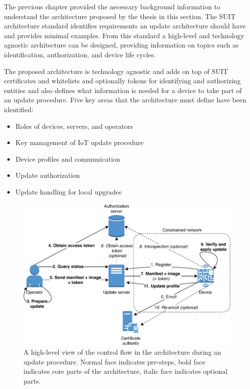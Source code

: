 \documentclass[0-thesis.tex]{subfiles}
\begin{document}
The previous chapter provided the necessary background information to understand the
architecture proposed by the thesis in this section. The SUIT architecture standard
identifies requirements an update architecture should have and provides minimal examples.
From this standard a high-level and technology agnostic architecture can be designed,
providing information on topics such as identification, authorization, and device life
cycles. 

The proposed architecture is technology agnostic and adds on top of SUIT certificates and
whitelists and optionally tokens for identifying and authorizing entities and also defines
what information is needed for a device to take part of an update procedure. Five key
areas that the architecture must define have been identified:

\begin{itemize}
    \item Roles of devices, servers, and operators
    \item Key management of IoT update procedure
    \item Device profiles and communication
    \item Update authorization
    \item Update handling for local upgrades
\end{itemize}

\begin{figure}[t]
    \caption{A high-level view of the control flow in the architecture during an update procedure. Normal face indicates pre-steps, bold face indicates core parts of the architecture, italic face indicates optional parts.}
    \label{fig:communication-workflow}
    \includegraphics{images/update-flow.pdf}
\end{figure}
\end{document}
